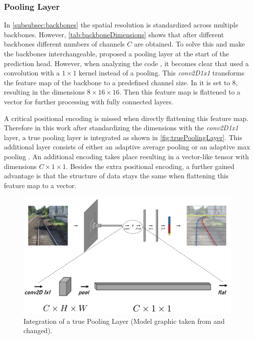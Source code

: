 \subsubsection{Pooling Layer}
\label{subsubsec:pooling}

In \autoref{subsubsec:backbones} the spatial resolution is standardized across multiple backbones.
However, \autoref{tab:backboneDimensions} shows that after different backbones different numbers of channels $C$ are obtained.
To solve this and make the backbones interchangeable, \cite{tepNet2024} proposed a pooling layer at the start of the prediction head.
However, when analyzing the code \cite{tepNet2024GitHub}, it becomes clear that \cite{tepNet2024} used a convolution with a $1 \times 1$ kernel instead of a pooling.
This \textit{conv2D1x1} transforms the feature map of the backbone to a predefined channel size.
In \cite{tepNet2024GitHub} it is set to 8, resulting in the dimensions $8 \times 16 \times 16$.
Then this feature map is flattened to a vector for further processing with fully connected layers.

A critical positional encoding is missed when directly flattening this feature map.
Therefore in this work after standardizing the dimensions with the \textit{conv2D1x1} layer, a true pooling layer is integrated as shown in \autoref{fig:truePoolingLayer}.
This additional layer consists of either an adaptive average pooling \cite{pytorch_averagePool_docu} or an adaptive max pooling \cite{pytorch_maxPool_docu}.
An additional encoding takes place resulting in a vector-like tensor with dimensions $C \times 1 \times 1$.
Besides the extra positional encoding, a further gained advantage is that the structure of data stays the same when flattening this feature map to a vector.

\begin{figure}[H]
    \centering
    \includegraphics[width=0.75\linewidth]{PICs/improvedModel/poolingLayers.jpg}
    \caption{Integration of a true Pooling Layer (Model graphic taken from \cite{tepNet2024} and changed).}
    \label{fig:truePoolingLayer}
\end{figure}

